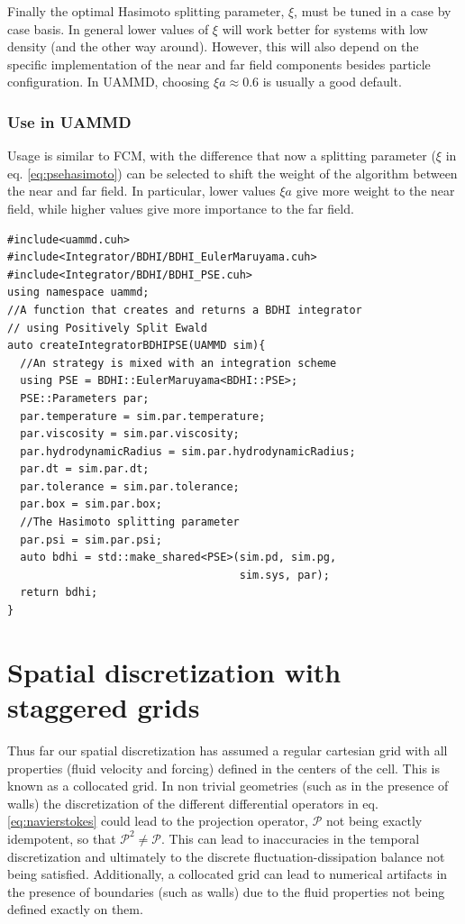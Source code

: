 \documentclass[ twoside,openright,titlepage,numbers=noenddot,%
headinclude,footinclude,cleardoublepage=empty,abstract=on,
BCOR=5mm,paper=a4,fontsize=11pt, dvipsnames
]{scrreprt}
\def\ucpp{uammd_cpp_lexer.py:UAMMDCppLexer -x}
\newcommand{\oper}[1]{\mathcal{#1}}
\newcommand{\uammd}{\gls{UAMMD}\xspace}
\begin{document}
Finally the optimal Hasimoto splitting parameter, $\xi$, must be tuned in a case by case basis. In general lower values of $\xi$ will work better for systems with low density (and the other way around). However, this will also depend on the specific implementation of the near and far field components besides particle configuration. In \uammd, choosing $\xi a \approx 0.6$ is usually a good default.

\subsubsection*{Use in UAMMD}

Usage is similar to \gls{FCM}, with the difference that now a splitting parameter ($\xi$ in eq. \eqref{eq:psehasimoto}) can be selected to shift the weight of the algorithm between the near and far field. In particular, lower values $\xi a$ give more weight to the near field, while higher values give more importance to the far field.

\begin{verbatim}
#include<uammd.cuh>
#include<Integrator/BDHI/BDHI_EulerMaruyama.cuh>
#include<Integrator/BDHI/BDHI_PSE.cuh>
using namespace uammd;
//A function that creates and returns a BDHI integrator
// using Positively Split Ewald
auto createIntegratorBDHIPSE(UAMMD sim){   
  //An strategy is mixed with an integration scheme
  using PSE = BDHI::EulerMaruyama<BDHI::PSE>;
  PSE::Parameters par;
  par.temperature = sim.par.temperature;
  par.viscosity = sim.par.viscosity;
  par.hydrodynamicRadius = sim.par.hydrodynamicRadius;
  par.dt = sim.par.dt;
  par.tolerance = sim.par.tolerance;
  par.box = sim.par.box;
  //The Hasimoto splitting parameter
  par.psi = sim.par.psi;
  auto bdhi = std::make_shared<PSE>(sim.pd, sim.pg, 
                                    sim.sys, par);
  return bdhi;
}
\end{verbatim}

\section{Spatial discretization with staggered grids}\label{sec:staggered}

Thus far our spatial discretization has assumed a regular cartesian grid with all properties (fluid velocity and forcing) defined in the centers of the cell. This is known as a collocated grid. In non trivial geometries (such as in the presence of walls) the discretization of the different differential operators in eq. \eqref{eq:navierstokes} could lead to the projection operator, $\oper{P}$ not being exactly idempotent, so that $\oper{P}^2 \ne \oper{P}$. This can lead to inaccuracies in the temporal discretization and ultimately to the discrete fluctuation-dissipation balance not being satisfied. Additionally, a collocated grid can lead to numerical artifacts in the presence of boundaries (such as walls) due to the fluid properties not being defined exactly on them.
\end{document}
